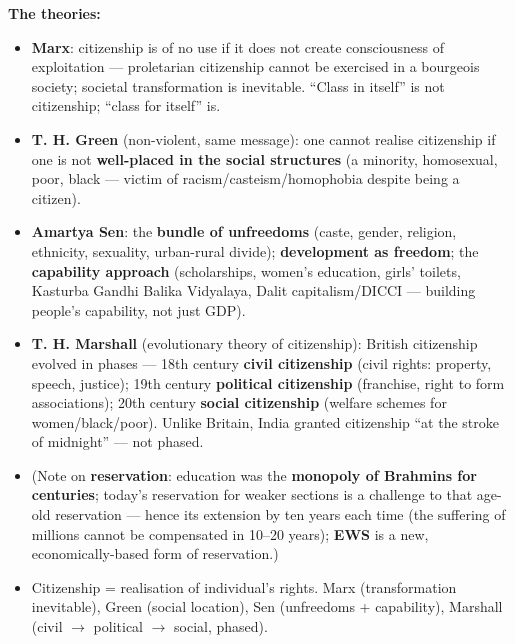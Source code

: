 \begin{DataFact}
\textbf{The theories:}
\begin{itemize}
\item \textbf{Marx}: citizenship is of no use if it does not create consciousness of exploitation --- proletarian citizenship cannot be exercised in a bourgeois society; societal transformation is inevitable. ``Class in itself'' is not citizenship; ``class for itself'' is.
\item \textbf{T. H. Green} (non-violent, same message): one cannot realise citizenship if one is not \textbf{well-placed in the social structures} (a minority, homosexual, poor, black --- victim of racism/casteism/homophobia despite being a citizen).
\item \textbf{Amartya Sen}: the \textbf{bundle of unfreedoms} (caste, gender, religion, ethnicity, sexuality, urban-rural divide); \textbf{development as freedom}; the \textbf{capability approach} (scholarships, women's education, girls' toilets, Kasturba Gandhi Balika Vidyalaya, Dalit capitalism/DICCI --- building people's capability, not just GDP).
\item \textbf{T. H. Marshall} (evolutionary theory of citizenship): British citizenship evolved in phases --- 18th century \textbf{civil citizenship} (civil rights: property, speech, justice); 19th century \textbf{political citizenship} (franchise, right to form associations); 20th century \textbf{social citizenship} (welfare schemes for women/black/poor). Unlike Britain, India granted citizenship ``at the stroke of midnight'' --- not phased.
\item (Note on \textbf{reservation}: education was the \textbf{monopoly of Brahmins for centuries}; today's reservation for weaker sections is a challenge to that age-old reservation --- hence its extension by ten years each time (the suffering of millions cannot be compensated in 10--20 years); \textbf{EWS} is a new, economically-based form of reservation.)
\end{itemize}
\end{DataFact}

\begin{QuickRevision}
\begin{itemize}
\item Citizenship = realisation of individual's rights. Marx (transformation inevitable), Green (social location), Sen (unfreedoms + capability), Marshall (civil $\rightarrow$ political $\rightarrow$ social, phased).
\end{itemize}
\end{QuickRevision}

